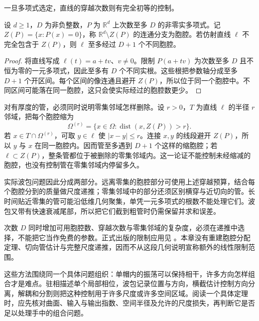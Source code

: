 一旦多项式选定，直线的穿越次数则有完全初等的控制。

\begin{lemma}[直线的胞腔穿越次数]\label{b2:lem:23-polynomial-line-crossing}
设 \(d\geq1\)，\(D\) 为非负整数，\(P\) 为 \(\mathbb R^d\) 上次数至多 \(D\) 的非零实多项式。记 \(Z(P)=\{x:P(x)=0\}\)，称 \(\mathbb R^d\setminus Z(P)\) 的连通分支为胞腔。若仿射直线 \(\ell\) 不完全包含于 \(Z(P)\)，则 \(\ell\) 至多经过 \(D+1\) 个不同胞腔。
\end{lemma}
\begin{proof}
将直线写成 \(\ell(t)=a+tv\)、\(v\neq0\)。限制 \(P(a+tv)\) 为次数至多 \(D\) 且不恒为零的一元多项式，因此至多有 \(D\) 个不同实根。这些根把参数轴分成至多 \(D+1\) 个开区间。每个区间的像连通且避开 \(Z(P)\)，所以位于同一个胞腔中。不同区间可能落在同一胞腔，这只会使实际经过的胞腔数更少。
\end{proof}

对有厚度的管，必须同时说明零集邻域怎样删除。设 \(r>0\)，\(T\) 为直线 \(\ell\) 的半径 \(r\) 邻域，把每个胞腔缩为
\[
 \Omega^{(r)}
 =\{x\in\Omega:\operatorname{dist}(x,Z(P))>r\}.
\]
若 \(x\in T\cap\Omega^{(r)}\)，可取 \(y\in\ell\) 使 \(|x-y|\leq r\)。连接 \(x,y\) 的线段避开 \(Z(P)\)，所以 \(y\) 与 \(x\) 在同一胞腔内。因而管至多遇到 \(D+1\) 个这样的缩胞腔；若 \(\ell\subset Z(P)\)，整条管都位于被删除的零集邻域内。这一论证不能控制未经缩减的胞腔，也没有控制管在零集邻域内停留多久。

\ProseParagraphBreak
实际波包问题因此分成两部分。远离零集的胞腔部分可使用上述穿越预算，结合每个胞腔分到的质量做尺度递推；零集邻域中的部分还须区别横穿与近切向的管。长时间贴近零集的管可能沿低维几何聚集，单凭一元多项式的根数不能处理它们。波包又带有快速衰减尾部，所以把它们截到粗管时仍需保留并求和误差。

次数 \(D\) 同时增加可用胞腔数、穿越次数与零集邻域的复杂度，必须在递推中选择，不能把它当作免费的参数。正式出版的限制应用见 \cite{Guth2016Restriction}。本章没有重建胞腔分配定理、切向管估计与完整尺度递推，因而不从这段几何说明宣称额外的线性限制范围。

\ProseParagraphBreak
这些方法围绕同一个具体问题组织：单帽内的振荡可以保持相干，许多方向怎样组合才是难点。驻相描述单个局部相位，波包记录位置与方向，横截估计控制方向分离，解耦和分割则把这种控制用于许多尺度或许多空间区域。阅读一个具体定理时，应先核对曲面、输入与输出指数、空间半径及允许的尺度损失，再判断它是否足以处理手中的组合问题。
